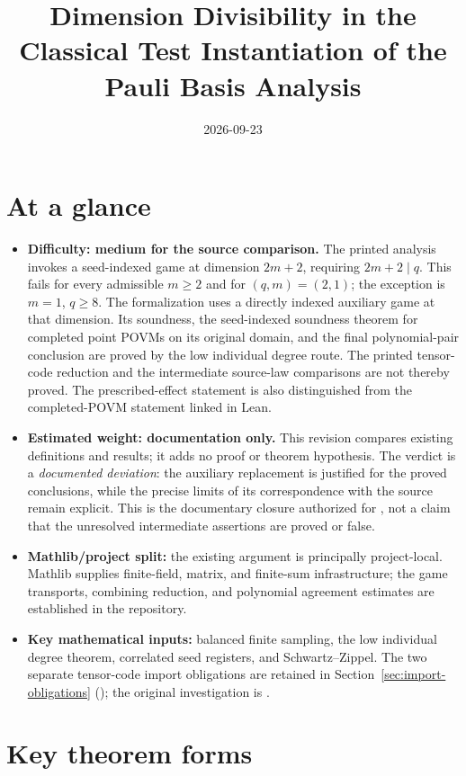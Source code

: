 \documentclass[11pt]{article}
\title{Dimension Divisibility in the Classical Test Instantiation of the
	Pauli Basis Analysis}
\author{}
\date{2026-09-23}
\begin{document}
\maketitle

\section{At a glance}

\begin{itemize}
  \item \textbf{Difficulty: medium for the source comparison.} The printed
  analysis invokes a seed-indexed game at dimension $2m+2$, requiring
  $2m+2\mid q$. This fails for every admissible $m\ge2$ and for
  $(q,m)=(2,1)$; the exception is $m=1$, $q\ge8$. The formalization uses a
  directly indexed auxiliary game at that dimension. Its soundness, the
  seed-indexed soundness theorem for completed point POVMs on its original
  domain, and the final
  polynomial-pair conclusion are proved by the low individual degree route.
  The printed tensor-code reduction and the intermediate source-law
  comparisons are not thereby proved. The prescribed-effect statement is
  also distinguished from the completed-POVM statement linked in Lean.
  \item \textbf{Estimated weight: documentation only.} This revision
  compares existing definitions and results; it adds no proof or theorem
  hypothesis. The verdict is a \emph{documented deviation}: the auxiliary
  replacement is justified for the proved conclusions, while the precise
  limits of its correspondence with the source remain explicit. This is
  the documentary closure authorized for , not a claim that
  the unresolved intermediate assertions are proved or false.
  \item \textbf{Mathlib/project split:} the existing argument is principally
  project-local. Mathlib supplies finite-field, matrix, and finite-sum
  infrastructure; the game transports, combining reduction, and polynomial
  agreement estimates are established in the repository.
  \item \textbf{Key mathematical inputs:} balanced finite sampling, the low
  individual degree theorem, correlated seed registers, and
  Schwartz--Zippel. The two separate tensor-code import obligations are
  retained in Section~\ref{sec:import-obligations} (); the
  original investigation is .
\end{itemize}

\section{Key theorem forms}
\end{document}
